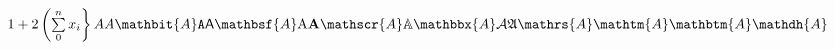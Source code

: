 \documentclass{article}
\begin{document}
$
1+2\left(\sum\limits_0^nx_i\right\}
A
\mathit{A}
\mathbit{A}
\mathtt{A}
\mathsf{A}
\mathbsf{A}
\mathrm{A}
\mathbf{A}
\mathscr{A}
\mathbb{A}
\mathbbx{A}
\mathcal{A}
\mathfrak{A}
\mathrs{A}
\mathtm{A}
\mathbtm{A}
\mathdh{A}
$
\end{document}
